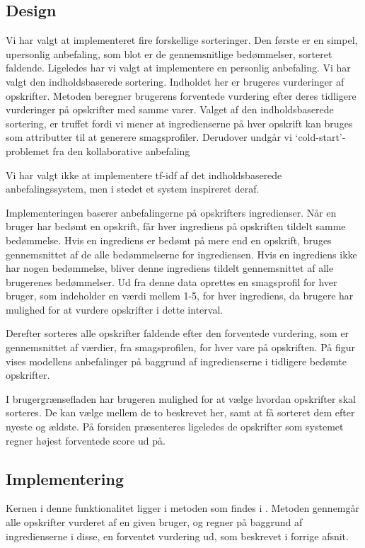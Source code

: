 \subsection{Design}
Vi har valgt at implementeret fire forskellige sorteringer.
Den første er en simpel, upersonlig anbefaling, som blot er de gennemsnitlige bedømmelser, sorteret faldende.
Ligeledes har vi valgt at implementere en personlig anbefaling.
Vi har valgt den indholdsbaserede sortering.
Indholdet her er brugeres vurderinger af opskrifter.
Metoden beregner brugerens forventede vurdering efter deres tidligere vurderinger på opskrifter med samme varer.
Valget af den indholdsbaserede sortering, er truffet fordi vi mener at ingredienserne på hver opskrift kan bruges som attributter til at generere smagsprofiler.
Derudover undgår vi ‘cold-start’-problemet fra den kollaborative anbefaling

Vi har valgt ikke at implementere tf-idf af det indholdsbaserede anbefalingssystem, men i stedet et system inspireret deraf. 

Implementeringen baserer anbefalingerne på opskrifters ingredienser.
Når en bruger har bedømt en opskrift, får hver ingrediens på opskriften tildelt samme bedømmelse.
Hvis en ingrediens er bedømt på mere end en opskrift, bruges gennemsnittet af de alle bedømmelserne for ingrediensen.
Hvis en ingrediens ikke har nogen bedømmelse, bliver denne ingrediens tildelt gennemsnittet af alle brugerenes bedømmelser.
Ud fra denne data oprettes en smagsprofil for hver bruger, som indeholder en værdi mellem 1-5, for hver ingrediens, da brugere har mulighed for at vurdere opskrifter i dette interval.


Derefter sorteres alle opskrifter faldende efter den forventede vurdering, som er gennemsnittet af værdier, fra smagsprofilen, for hver vare på opskriften. 
På figur  vises modellens anbefalinger på baggrund af ingredienserne i tidligere bedømte opskrifter.


I brugergrænsefladen har brugeren mulighed for at vælge hvordan opskrifter skal sorteres.
De kan vælge mellem de to beskrevet her, samt at få sorteret dem efter nyeste og ældste.
På forsiden præsenteres ligeledes de opskrifter som systemet regner højest forventede score ud på.

\subsection{Implementering}
Kernen i denne funktionalitet ligger i metoden  som findes i .
Metoden gennemgår alle opskrifter vurderet af en given bruger, og regner på baggrund af ingredienserne i disse, en forventet vurdering ud, som beskrevet i forrige afsnit.


